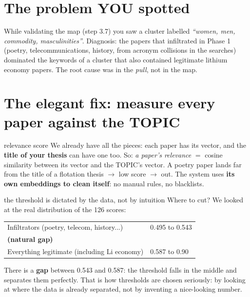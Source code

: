 \documentclass[11pt,a4paper]{article}
\begin{document}

\section{The problem YOU spotted}

While validating the map (step 3.7) you saw a cluster labelled \emph{``women, men, commodity,
masculinities''}. Diagnosis: the papers that infiltrated in Phase 1 (poetry,
telecommunications, history, from acronym collisions in the searches) dominated the keywords
of a cluster that also contained legitimate lithium economy papers. The root cause was in the
\emph{pull}, not in the map.

\section{The elegant fix: measure every paper against the TOPIC}

\begin{concepto}{relevance score}
We already have all the pieces: each paper has its vector, and the \textbf{title of your
thesis} can have one too. So: \emph{a paper's relevance} $=$ cosine similarity between its
vector and the TOPIC's vector. A poetry paper lands far from the title of a flotation thesis
$\rightarrow$ low score $\rightarrow$ out. The system uses \textbf{its own embeddings to clean
itself}: no manual rules, no blacklists.
\end{concepto}

\begin{concepto}{the threshold is dictated by the data, not by intuition}
Where to cut? We looked at the real distribution of the 126 scores:
\begin{center}
\begin{tabular}{ll}
Infiltrators (poetry, telecom, history...) & 0.495 to 0.543 \\
\textbf{(natural gap)} & \\
Everything legitimate (including Li economy) & 0.587 to 0.90 \\
\end{tabular}
\end{center}
There is a \textbf{gap} between 0.543 and 0.587: the threshold
 falls in the middle and separates them perfectly. That is
how thresholds are chosen seriously: by looking at where the data is already separated, not by
inventing a nice-looking number.
\end{concepto}
\end{document}
